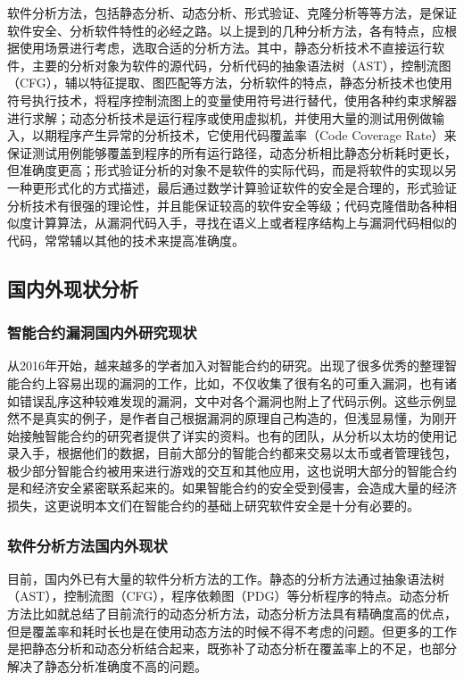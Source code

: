 软件分析方法，包括静态分析、动态分析、形式验证、克隆分析等等方法，是保证软件安全、分析软件特性的必经之路。以上提到的几种分析方法，各有特点，应根据使用场景进行考虑，选取合适的分析方法。其中，静态分析技术不直接运行软件，主要的分析对象为软件的源代码，分析代码的抽象语法树（AST），控制流图（CFG），辅以特征提取\cite{deckard}、图匹配等方法，分析软件的特点，静态分析技术也使用符号执行技术，将程序控制流图上的变量使用符号进行替代，使用各种约束求解器进行求解；动态分析技术是运行程序或使用虚拟机，并使用大量的测试用例做输入，以期程序产生异常的分析技术，它使用代码覆盖率（Code Coverage Rate）来保证测试用例能够覆盖到程序的所有运行路径，动态分析相比静态分析耗时更长，但准确度更高；形式验证分析的对象不是软件的实际代码，而是将软件的实现以另一种更形式化的方式描述，最后通过数学计算验证软件的安全是合理的，形式验证分析技术有很强的理论性，并且能保证较高的软件安全等级；代码克隆借助各种相似度计算算法，从漏洞代码入手，寻找在语义上或者程序结构上与漏洞代码相似的代码，常常辅以其他的技术来提高准确度。

\subsection{国内外现状分析}

\subsubsection{智能合约漏洞国内外研究现状}

从2016年开始，越来越多的学者加入对智能合约的研究。出现了很多优秀的整理智能合约上容易出现的漏洞的工作，比如\cite{survey-on-attacks}，不仅收集了很有名的可重入漏洞，也有诸如错误乱序这种较难发现的漏洞，文中对各个漏洞也附上了代码示例。这些示例显然不是真实的例子，是作者自己根据漏洞的原理自己构造的，但浅显易懂，为刚开始接触智能合约的研究者提供了详实的资料。也有的团队\cite{survey-on-smart-contracts}，从分析以太坊的使用记录入手，根据他们的数据，目前大部分的智能合约都来交易以太币或者管理钱包，极少部分智能合约被用来进行游戏的交互和其他应用，这也说明大部分的智能合约是和经济安全紧密联系起来的。如果智能合约的安全受到侵害，会造成大量的经济损失，这更说明本文们在智能合约的基础上研究软件安全是十分有必要的。

\subsubsection{软件分析方法国内外现状}

目前，国内外已有大量的软件分析方法的工作。静态的分析方法通过抽象语法树（AST），控制流图（CFG），程序依赖图（PDG）等分析程序的特点。动态分析方法比如\cite{survey-dynamic}就总结了目前流行的动态分析方法，动态分析方法具有精确度高的优点，但是覆盖率和耗时长也是在使用动态方法的时候不得不考虑的问题。但更多的工作是把静态分析和动态分析结合起来，既弥补了动态分析在覆盖率上的不足，也部分解决了静态分析准确度不高的问题。

